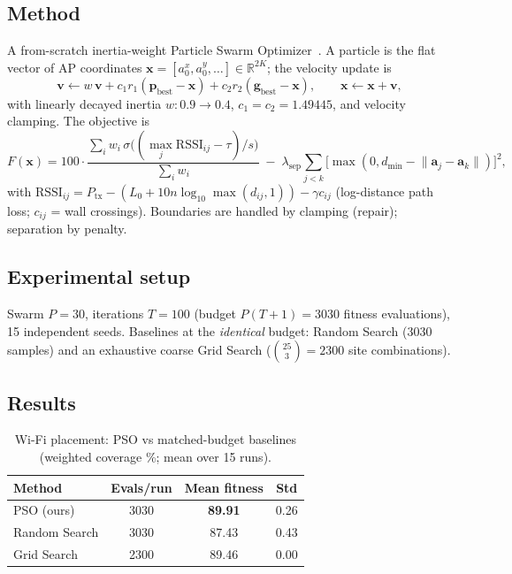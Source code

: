 \documentclass[11pt]{article}
\begin{document}
\subsection{Method}
A from-scratch inertia-weight Particle Swarm Optimizer~\cite{kennedy1995,
shi1998}. A particle is the flat vector of AP coordinates
$\mathbf{x}=[a^x_0,a^y_0,\dots]\in\mathbb{R}^{2K}$; the velocity update is
\begin{equation}
\mathbf{v}\leftarrow w\,\mathbf{v}
  + c_1 r_1(\mathbf{p}_{\text{best}}-\mathbf{x})
  + c_2 r_2(\mathbf{g}_{\text{best}}-\mathbf{x}),\qquad
\mathbf{x}\leftarrow\mathbf{x}+\mathbf{v},
\end{equation}
with linearly decayed inertia $w:0.9\!\to\!0.4$, $c_1=c_2=1.49445$, and velocity
clamping. The objective is
\begin{equation}
F(\mathbf{x}) = 100\cdot\frac{\sum_i w_i\,\sigma\!\big((\max_j \mathrm{RSSI}_{ij}-\tau)/s\big)}{\sum_i w_i}
  \;-\;\lambda_{\text{sep}}\!\!\sum_{j<k}\big[\max(0,d_{\min}-\lVert\mathbf{a}_j-\mathbf{a}_k\rVert)\big]^2,
\end{equation}
with $\mathrm{RSSI}_{ij}=P_{\text{tx}}-(L_0+10n\log_{10}\max(d_{ij},1))-\gamma c_{ij}$
(log-distance path loss; $c_{ij}$ = wall crossings). Boundaries are handled by
clamping (repair); separation by penalty.

\subsection{Experimental setup}
Swarm $P=30$, iterations $T=100$ (budget $P(T{+}1)=3030$ fitness evaluations),
15 independent seeds. Baselines at the \emph{identical} budget: Random Search
(3030 samples) and an exhaustive coarse Grid Search
($\binom{25}{3}=2300$ site combinations).

\subsection{Results}
\begin{table}[h]\centering
\caption{Wi-Fi placement: PSO vs matched-budget baselines (weighted coverage
\%; mean over 15 runs).}
\begin{tabular}{lccc}
\toprule
Method & Evals/run & Mean fitness & Std \\
\midrule
PSO (ours)   & 3030 & \textbf{89.91} & 0.26 \\
Random Search& 3030 & 87.43 & 0.43 \\
Grid Search  & 2300 & 89.46 & 0.00 \\
\bottomrule
\end{tabular}
\end{table}
\end{document}
